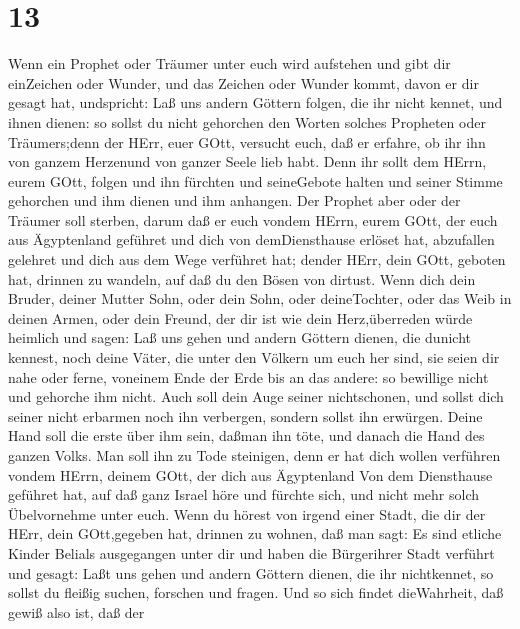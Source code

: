 \hypertarget{section-12}{%
\section{13}\label{section-12}}

 Wenn ein Prophet oder Träumer unter euch wird aufstehen und
gibt dir einZeichen oder Wunder,  und das Zeichen oder
Wunder kommt, davon er dir gesagt hat, undspricht: Laß uns andern
Göttern folgen, die ihr nicht kennet, und ihnen dienen:  so
sollst du nicht gehorchen den Worten solches Propheten oder
Träumers;denn der HErr, euer GOtt, versucht euch, daß er erfahre, ob ihr
ihn von ganzem Herzenund von ganzer Seele lieb habt.  Denn
ihr sollt dem HErrn, eurem GOtt, folgen und ihn fürchten und seineGebote
halten und seiner Stimme gehorchen und ihm dienen und ihm anhangen.
 Der Prophet aber oder der Träumer soll sterben, darum daß
er euch vondem HErrn, eurem GOtt, der euch aus Ägyptenland geführet und
dich von demDiensthause erlöset hat, abzufallen gelehret und dich aus
dem Wege verführet hat; dender HErr, dein GOtt, geboten hat, drinnen zu
wandeln, auf daß du den Bösen von dirtust.  Wenn dich dein
Bruder, deiner Mutter Sohn, oder dein Sohn, oder deineTochter, oder das
Weib in deinen Armen, oder dein Freund, der dir ist wie dein
Herz,überreden würde heimlich und sagen: Laß uns gehen und andern
Göttern dienen, die dunicht kennest, noch deine Väter,  die
unter den Völkern um euch her sind, sie seien dir nahe oder ferne,
voneinem Ende der Erde bis an das andere:  so bewillige
nicht und gehorche ihm nicht. Auch soll dein Auge seiner nichtschonen,
und sollst dich seiner nicht erbarmen noch ihn verbergen, 
sondern sollst ihn erwürgen. Deine Hand soll die erste über ihm sein,
daßman ihn töte, und danach die Hand des ganzen Volks.  Man
soll ihn zu Tode steinigen, denn er hat dich wollen verführen vondem
HErrn, deinem GOtt, der dich aus Ägyptenland Von dem Diensthause
geführet hat,  auf daß ganz Israel höre und fürchte sich,
und nicht mehr solch Übelvornehme unter euch.  Wenn du
hörest von irgend einer Stadt, die dir der HErr, dein GOtt,gegeben hat,
drinnen zu wohnen, daß man sagt:  Es sind etliche Kinder
Belials ausgegangen unter dir und haben die Bürgerihrer Stadt verführt
und gesagt: Laßt uns gehen und andern Göttern dienen, die ihr
nichtkennet,  so sollst du fleißig suchen, forschen und
fragen. Und so sich findet dieWahrheit, daß gewiß also ist, daß der
